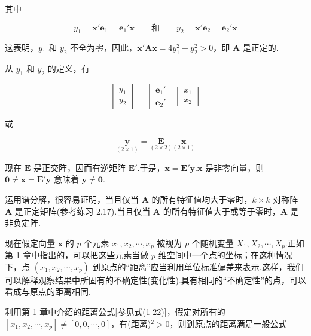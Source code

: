 其中

\[
y_1=\bm{x}'\bm{e}_1=\bm{e}_1'\bm{x} \qquad \text{和} \qquad y_2=\bm{x}'\bm{e}_2=\bm{e}_2'\bm{x}
\]

这表明，$y_1$ 和 $y_2$ 不全为零，因此，$\bm{x}'\bm{A}\bm{x}=4y_1^2+y_2^2>0$，即 $\bm{A}$ 是正定的.

从 $y_1$ 和 $y_2$ 的定义，有

\[
\begin{bmatrix}
y_1\\
y_2
\end{bmatrix}
=
\begin{bmatrix}
\bm{e}_1'\\
\bm{e}_2'
\end{bmatrix}
\begin{bmatrix}
x_1\\
x_2
\end{bmatrix}
\]

或

\[
\underset{(2\times1)}{\bm{y}}=\underset{(2\times2)}{\bm{E}}\underset{(2\times1)}{\bm{x}}
\]

现在 $\bm{E}$ 是正交阵，因而有逆矩阵 $\bm{E}'$.于是，$\bm{x}=\bm{E}'\bm{y}$.$\bm{x}$ 是非零向量，则 $\bm{0}\neq \bm{x}=\bm{E}'\bm{y}$ 意味着 $\bm{y}\neq \bm{0}$.

运用谱分解，很容易证明，当且仅当 $\bm{A}$ 的所有特征值均大于零时，$k\times k$ 对称阵 $\bm{A}$ 是正定矩阵(参考练习 2.17).当且仅当 $\bm{A}$ 的所有特征值大于或等于零时，$\bm{A}$ 是非负定阵.

现在假定向量 $\bm{x}$ 的 $p$ 个元素 $x_1,x_2,\cdots,x_p$ 被视为 $p$ 个随机变量 $X_1,X_2,\cdots,X_p$.正如第 1 章中指出的，可以把这些元素当做 $p$ 维空间中一个点的坐标；在这种情况下，点 $(x_1,x_2,\cdots,x_p)$ 到原点的“距离”应当利用单位标准偏差来表示.这样，我们可以解释观察结果中所固有的不确定性(变化性).具有相同的“不确定性”的点，可以看成与原点的距离相同.

利用第 1 章中介绍的距离公式[参见\hyperref[eq:1-22]{式(1-22)}]，假定对所有的 $[x_1,x_2,\cdots,x_p]\neq[0,0,\cdots,0]$，有(距离)$^2>0$，则到原点的距离满足一般公式
